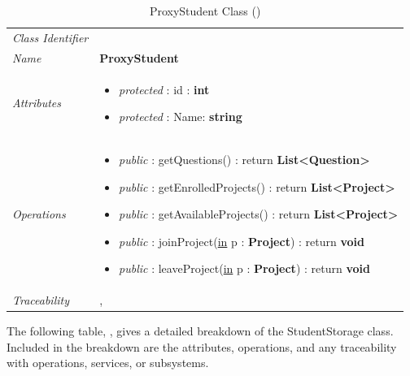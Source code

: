 \documentclass[12pt,letterpaper]{article}
\begin{document}
\begin{table}[H]
    \caption{ProxyStudent Class ()} 
	\begin{tabu} to 
		\toprule
		Class Identifier &  \\
		Name & {\bf ProxyStudent} \\
		Attributes & 
		\begin{minipage}[t]{\linewidth}
		    \begin{itemize}
		        \item \textit{protected} : id : {\bf int}
		        \item \textit{protected} : Name: {\bf string}
			\end{itemize}
	    \end{minipage} \\

		Operations &
		\begin{minipage}[t]{\linewidth}
			\begin{itemize}
			    \item {\it public} : getQuestions() : return {\bf List<Question>}
			    \item {\it public} : getEnrolledProjects() : return {\bf List<Project>}
			    \item {\it public} : getAvailableProjects() : return {\bf List<Project>}
			    \item {\it public} : joinProject(\underline{in} p : {\bf Project}) : return {\bf void}
			    \item {\it public} : leaveProject(\underline{in} p : {\bf Project}) : return {\bf void}
	        \end{itemize}
	    \end{minipage} \\
	    	Traceability & , \\
		\toprule
	\end{tabu}
\end{table}

The following table, , gives a detailed breakdown of the StudentStorage class. Included in the breakdown are the attributes, operations, and any traceability with operations, services, or subsystems.
\end{document}
